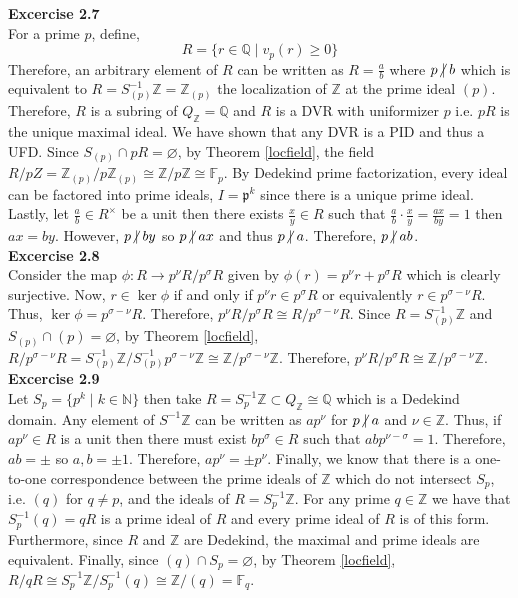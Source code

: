 \documentclass[12pt]{extarticle}
\newcommand{\ndivides}{\centernot \mid}
\newcommand{\Z}{\mathbb{Z}}
\newcommand{\N}{\mathbb{N}}
\newcommand{\Q}{\mathbb{Q}}
\newcommand{\finfield}[1]{\mathbb{F}_{#1}}
\theoremstyle{definition}
\begin{document}
\textbf{Excercise 2.7}\\
For a prime $p$, define,
\[ R = \{ r \in \Q \mid v_p(r) \ge 0 \} \]
Therefore, an arbitrary element of $R$ can be written as $R = \frac{a}{b}$ where $p \ndivides b$ which is equivalent to $R = S_{(p)}^{-1} \Z = \Z_{(p)}$ the localization of $\Z$ at the prime ideal $(p)$. Therefore, $R$ is a subring of $Q_{\Z} = \Q$ and $R$ is a DVR with uniformizer $p$ i.e. $p R$ is the unique maximal ideal. We have shown that any DVR is a PID and thus a UFD. Since $S_{(p)} \cap pR = \varnothing$, by Theorem \ref{locfield}, the field $R / p Z = \Z_{(p)}/ p \Z_{(p)} \cong \Z / p \Z \cong \finfield{p}$. By Dedekind prime factorization, every ideal can be factored into prime ideals, $I = \mathfrak{p}^k$ since there is a unique prime ideal. Lastly, let $\frac{a}{b} \in R^\times$ be a unit then there exists $\frac{x}{y} \in R$ such that $\frac{a}{b} \cdot \frac{x}{y} = \frac{ax}{by} = 1$ then $ax = by$. However, $p \ndivides by$ so $p \ndivides ax$ and thus $p \ndivides a$. Therefore, $p \ndivides ab$.   
\bigskip \\
\textbf{Excercise 2.8}\\ 
Consider the map $\phi : R \to p^\nu R / p^\sigma R$ given by $\phi(r) = p^\nu r + p^\sigma R$ which is clearly surjective. Now, $r \in \ker{\phi}$ if and only if $p^\nu r \in p^{\sigma} R$ or equivalently $r \in p^{\sigma - \nu} R$. Thus, $\ker{\phi} = p^{\sigma - \nu} R$. Therefore, $p^\nu R / p^\sigma R \cong R / p^{\sigma - \nu} R$. Since $R = S_{(p)}^{-1} \Z$ and $S_{(p)} \cap (p) = \varnothing$, by Theorem \ref{locfield}, $R / p^{\sigma - \nu} R = S_{(p)}^{-1} \Z / S_{(p)}^{-1} p^{\sigma - \nu} \Z \cong \Z / p^{\sigma - \nu} \Z$. Therefore, $p^\nu R / p^\sigma R \cong \Z / p^{\sigma - \nu} \Z$.
\bigskip \\
\textbf{Excercise 2.9}\\ 
Let $S_p = \{p^k \mid k \in \N \}$ then take $R = S_p^{-1} \Z \subset Q_{\Z} \cong \Q$ which is a Dedekind domain. Any element of $S^{-1} \Z$ can be written as $a p^\nu$ for $p \ndivides a$ and $\nu \in \Z$. Thus, if $a p^\nu \in R$ is a unit then there must exist $b p^\sigma \in R$ such that $ab p^{\nu - \sigma} = 1$. Therefore, $ab = \pm$ so $a, b = \pm 1$. Therefore, $a p^\nu = \pm p^\nu$. Finally, we know that there is a one-to-one correspondence between the prime ideals of $\Z$ which do not intersect $S_p$, i.e. $(q)$ for $q \neq p$, and the ideals of $R = S_p^{-1} \Z$. For any prime $q \in \Z$ we have that $S_p^{-1} (q) = q R$ is a prime ideal of $R$ and every prime ideal of $R$ is of this form. Furthermore, since $R$ and $\Z$ are Dedekind, the maximal and prime ideals are equivalent. Finally, since $(q) \cap S_p = \varnothing$, by Theorem \ref{locfield}, $R / q R \cong S_p^{-1} \Z / S_p^{-1} (q) \cong \Z / (q) = \finfield{q}$.    
\end{document}
